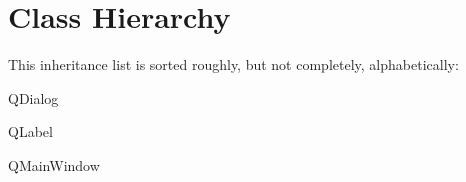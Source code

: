 \section{Class Hierarchy}
This inheritance list is sorted roughly, but not completely, alphabetically\+:\begin{DoxyCompactList}
\item {}
\item Q\+Dialog\begin{DoxyCompactList}
\item {}
\begin{DoxyCompactList}
\item {}
\item {}
\end{DoxyCompactList}
\end{DoxyCompactList}
\item Q\+Label\begin{DoxyCompactList}
\item {}
\item {}
\begin{DoxyCompactList}
\item {}
\item {}
\item {}
\end{DoxyCompactList}
\end{DoxyCompactList}
\item Q\+Main\+Window\begin{DoxyCompactList}
\item {}
\end{DoxyCompactList}
\end{DoxyCompactList}

